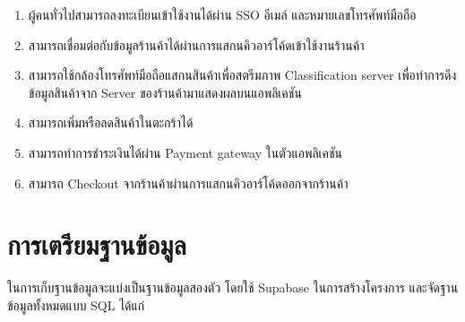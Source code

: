 \begin{enumerate}
  \item ผู้คนทั่วไปสามารถลงทะเบียนเข้าใช้งานได้ผ่าน SSO อีเมล์ และหมายเลขโทรศัพท์มือถือ
  \item สามารถเชื่อมต่อกับข้อมูลร้านค้าได้ผ่านการแสกนคิวอาร์โค้ดเข้าใช้งานร้านค้า
  \item สามารถใช้กล้องโทรศัพท์มือถือแสกนสินค้าเพื่อสตรีมภาพ Classification server เพื่อทำการดึงข้อมูลสินค้าจาก Server ของร้านค้ามาแสดงผลบนแอพลิเคชัน
  \item สามารถเพิ่มหรือลดสินค้าในตะกร้าได้
  \item สามารถทำการชำระเงินได้ผ่าน Payment gateway ในตัวแอพลิเคชัน
  \item สามารถ Checkout จากร้านค้าผ่านการแสกนคิวอาร์โค้ดออกจากร้านค้า
 
\end{enumerate}


\section{การเตรียมฐานข้อมูล}
ในการเก็บฐานข้อมูลจะแบ่งเป็นฐานข้อมูลสองตัว โดยใช้ Supabase 
ในการสร้างโครงการ และจัดฐานข้อมูลทั้งหมดแบบ SQL ได้แก่ 
